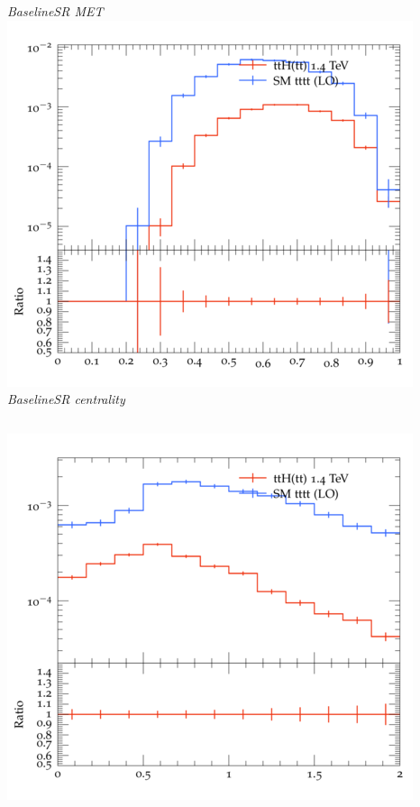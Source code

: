 \documentclass{beamer}
\begin{document}
\begin{frame}
\begin{columns}
\textit{\small BaselineSR MET}
\includegraphics[width=\textwidth]{../plots/ttH_1400/tttt_ttH_1LOS/BaselineSR_centrality.png}\\
\textit{\small BaselineSR centrality}
\end{columns}
\begin{columns}
\includegraphics[width=\textwidth]{../plots/ttH_1400/tttt_ttH_1LOS/BaselineSR_deltaR_bl_min.png}\\

\end{columns}
\end{frame}
\end{document}
